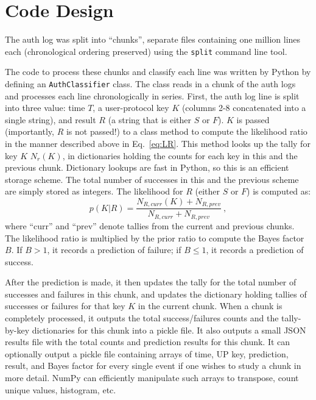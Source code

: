 \documentclass[aps, prd, amsmath, floats, floatfix, superscriptaddress,
nofootinbib,eqsecnum]{revtex4}
\begin{document}
\section{Code Design}
\label{sec:Code}

The auth log was split into ``chunks'', separate files containing
one million lines each (chronological ordering preserved) using the {\tt split} command line tool. 

The code to process these chunks and classify each line was written by Python by defining an {\tt AuthClassifier} class.
The class reads in a chunk of the auth logs and processes each line chronologically in series.
First, the auth log line is split into three value: time $T$, a user-protocol key $K$
(columns 2-8 concatenated into a single string), and result $R$ (a string that is either $S$ or $F$).
$K$ is passed (importantly, $R$ is not passed!) to a class method to compute the likelihood ratio
in the manner described above in Eq.~\ref{eq:LR}.
This method looks up the tally for key $K$ $N_r(K)$, in dictionaries holding the counts for each key
in this and the previous chunk. Dictionary lookups are fast in Python, so this is an efficient storage scheme.
The total number of successes in this and the previous scheme are simply stored as integers. The likelihood for $R$
(either $S$ or $F$) is computed as:
\begin{equation}
p(K|R) = \frac{N_{R,curr}(K) + N_{R,prev}}{N_{R,curr} + N_{R,prev}}\ ,
\end{equation}
where ``curr'' and ``prev'' denote tallies from the current and previous chunks.  
The likelihood ratio is multiplied by the prior ratio to compute the Bayes factor $B$. If $B > 1$,
it records a prediction of failure;
if $B \leq 1$, it records a prediction of success.

After the prediction is made, it then updates the tally for the total number of successes and failures in this chunk,
and updates the dictionary holding tallies of successes or failures for that key $K$ in the current chunk. 
When a chunk is completely processed, it outputs the total success/failures counts and the tally-by-key dictionaries for this
chunk into a pickle file. It also outputs a small JSON results file with the total counts and prediction results for this chunk.
It can optionally output a pickle file containing arrays of time, UP key, prediction, result, and Bayes factor for every single
event if one wishes to study a chunk in more detail.
NumPy can efficiently manipulate such arrays to transpose, count unique values, histogram, etc.
\end{document}
